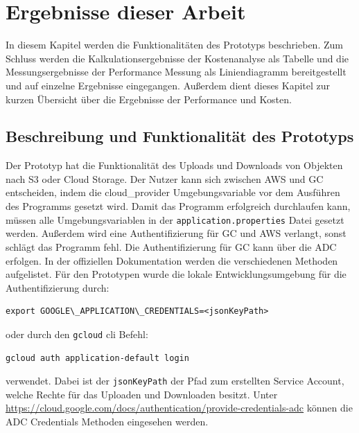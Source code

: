 \chapter{Ergebnisse dieser Arbeit}

In diesem Kapitel werden die Funktionalitäten des Prototyps beschrieben. Zum Schluss werden die Kalkulationsergebnisse der Kostenanalyse als Tabelle und die Messungsergebnisse der Performance Messung als Liniendiagramm bereitgestellt und auf einzelne Ergebnisse eingegangen. Außerdem dient dieses Kapitel zur kurzen Übersicht über die Ergebnisse der Performance und Kosten. 

\section{Beschreibung und Funktionalität des Prototyps}

Der Prototyp hat die Funktionalität des Uploads und Downloads von Objekten nach S3 oder Cloud Storage. Der Nutzer kann sich zwischen AWS und GC entscheiden, indem die cloud\_provider Umgebungsvariable vor dem Ausführen des Programms gesetzt wird. Damit das Programm erfolgreich durchlaufen kann, müssen alle Umgebungsvariablen in der \verb|application.properties| Datei gesetzt werden. Außerdem wird eine Authentifizierung für GC und AWS verlangt, sonst schlägt das Programm fehl. Die Authentifizierung für GC kann über die ADC erfolgen. In der offiziellen Dokumentation werden die verschiedenen Methoden aufgelistet. Für den Prototypen wurde die lokale Entwicklungsumgebung für die Authentifizierung durch: 

\begin{lstlisting}
export GOOGLE\_APPLICATION\_CREDENTIALS=<jsonKeyPath>
\end{lstlisting}
	
	oder durch den \verb|gcloud| cli Befehl: 
	
\begin{lstlisting}
gcloud auth application-default login
\end{lstlisting}
	
	verwendet. Dabei ist der \verb|jsonKeyPath| der Pfad zum erstellten Service Account, welche Rechte für das Uploaden und Downloaden besitzt. Unter \url{https://cloud.google.com/docs/authentication/provide-credentials-adc} können die ADC Credentials Methoden eingesehen werden.\\
	
